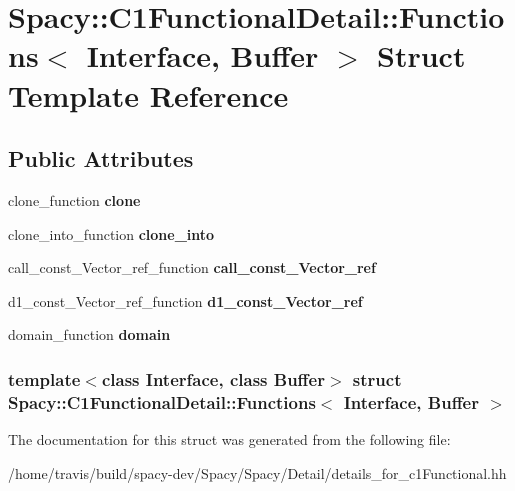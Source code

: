 \hypertarget{structSpacy_1_1C1FunctionalDetail_1_1Functions}{\section{\-Spacy\-:\-:\-C1\-Functional\-Detail\-:\-:\-Functions$<$ \-Interface, \-Buffer $>$ \-Struct \-Template \-Reference}
\label{structSpacy_1_1C1FunctionalDetail_1_1Functions}
}
\subsection*{\-Public \-Attributes}
\begin{DoxyCompactItemize}
\item 
\hypertarget{structSpacy_1_1C1FunctionalDetail_1_1Functions_ab82a6b68c54a99e9bdc08d61d73d768a}{clone\-\_\-function {\bfseries clone}}\label{structSpacy_1_1C1FunctionalDetail_1_1Functions_ab82a6b68c54a99e9bdc08d61d73d768a}

\item 
\hypertarget{structSpacy_1_1C1FunctionalDetail_1_1Functions_a60e2ec9b2909a1a6b238d50e83342e6f}{clone\-\_\-into\-\_\-function {\bfseries clone\-\_\-into}}\label{structSpacy_1_1C1FunctionalDetail_1_1Functions_a60e2ec9b2909a1a6b238d50e83342e6f}

\item 
\hypertarget{structSpacy_1_1C1FunctionalDetail_1_1Functions_afab51f9842fb2273c0788b0249a4153c}{call\-\_\-const\-\_\-\-Vector\-\_\-ref\-\_\-function {\bfseries call\-\_\-const\-\_\-\-Vector\-\_\-ref}}\label{structSpacy_1_1C1FunctionalDetail_1_1Functions_afab51f9842fb2273c0788b0249a4153c}

\item 
\hypertarget{structSpacy_1_1C1FunctionalDetail_1_1Functions_a55b95033de22b538ebe7a2e6de10be2f}{d1\-\_\-const\-\_\-\-Vector\-\_\-ref\-\_\-function {\bfseries d1\-\_\-const\-\_\-\-Vector\-\_\-ref}}\label{structSpacy_1_1C1FunctionalDetail_1_1Functions_a55b95033de22b538ebe7a2e6de10be2f}

\item 
\hypertarget{structSpacy_1_1C1FunctionalDetail_1_1Functions_aa296765acd49200d58774d50eb3d0065}{domain\-\_\-function {\bfseries domain}}\label{structSpacy_1_1C1FunctionalDetail_1_1Functions_aa296765acd49200d58774d50eb3d0065}

\end{DoxyCompactItemize}
\subsubsection*{template$<$class \-Interface, class \-Buffer$>$ struct Spacy\-::\-C1\-Functional\-Detail\-::\-Functions$<$ Interface, Buffer $>$}



\-The documentation for this struct was generated from the following file\-:\begin{DoxyCompactItemize}
\item 
/home/travis/build/spacy-\/dev/\-Spacy/\-Spacy/\-Detail/details\-\_\-for\-\_\-c1\-Functional.\-hh\end{DoxyCompactItemize}
